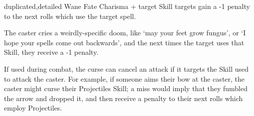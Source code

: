   {duplicated,detailed}%
  {Wane}%
  {Fate}%
  {Charisma + target Skill}%
  {\spellArea{} targets gain a -1 penalty to the next  rolls which use the target spell.}%
  {The caster cries a weirdly-specific doom, like `may your feet grow fungus', or `I hope your spells come out backwards', and the next  times the target uses that Skill, they receive a -1 penalty.

  If used during combat, the curse can cancel an attack if it targets the Skill used to attack the caster.
  For example, if someone aims their bow at the caster, the caster might curse their Projectiles Skill; a miss would imply that they fumbled the arrow and dropped it, and then receive a penalty to their next  rolls which employ Projectiles.}

